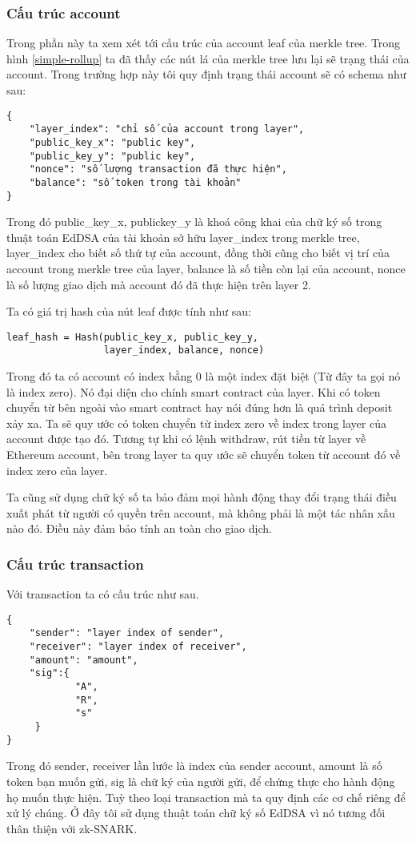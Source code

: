 \documentclass[../thesis.tex]{subfiles}
\begin{document}
\subsubsection{Cấu trúc account}
Trong phần này ta xem xét tới cấu trúc của account leaf của merkle tree. Trong hình \ref{simple-rollup} ta đã thấy các nút lá của merkle tree lưu lại sẽ trạng thái của account. 
Trong trường hợp này tôi quy định trạng thái account sẽ có schema như sau:

\begin{verbatim}
{
	"layer_index": "chỉ số của account trong layer",
	"public_key_x": "public key",
	"public_key_y": "public key",
	"nonce": "số lượng transaction đã thực hiện",
	"balance": "số token trong tài khoản"
}
\end{verbatim}

Trong đó public\_key\_x, publickey\_y là khoá công khai của chữ ký số trong thuật toán EdDSA của tài khoản sở hữu layer\_index trong merkle tree, layer\_index cho biết số thứ tự của account, đồng thời cũng cho biết vị trí của account trong merkle tree của layer, balance là số tiền còn lại của account, nonce là số lượng giao dịch mà account đó đã thực hiện trên layer 2.

Ta có giá trị hash của nút leaf được tính như sau:

\begin{verbatim}
leaf_hash = Hash(public_key_x, public_key_y, 
                 layer_index, balance, nonce)
\end{verbatim}

Trong đó ta có account có index bằng 0 là một index đặt biệt (Từ đây ta gọi nó là index zero). Nó đại diện cho chính smart contract của layer. Khi có token chuyển từ bên ngoài vào smart contract hay nói đúng hơn là quá trình deposit xảy xa. Ta sẽ quy ước có token chuyển từ index zero về index trong layer của account được tạo đó. Tương tự khi có lệnh withdraw, rút tiền từ layer về Ethereum account, bên trong layer ta quy ước sẽ chuyển token từ account đó về index zero của layer.

Ta cũng sử dụng chữ ký số ta bảo đảm mọi hành động thay đổi trạng thái điều xuất phát từ người có quyền trên account, mà không phải là một tác nhân xấu nào đó.
Điều này đảm bảo tính an toàn cho giao dịch.

\subsubsection{Cấu trúc transaction}
Với transaction ta có cấu trúc như sau.
\begin{verbatim}
{
	"sender": "layer index of sender",
	"receiver": "layer index of receiver",
	"amount": "amount",
	"sig":{ 
			"A", 
			"R", 
			"s"
  	 } 
}
\end{verbatim}
Trong đó sender, receiver lần lước là index của sender account, amount là số token bạn muốn gửi, sig là chữ ký của người gửi, để chứng thực cho hành động họ muốn thực hiện. Tuỳ theo loại transaction mà ta quy định các cơ chế riêng để xử lý chúng. Ở đây tôi sử dụng thuật toán chữ ký số EdDSA vì nó tương đối thân thiện với zk-SNARK.
\end{document}
